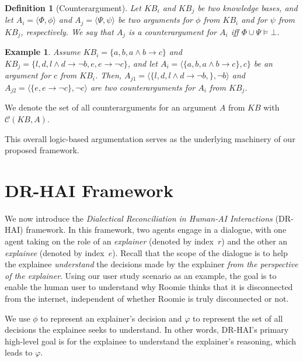 \documentclass{ecai}
\newtheorem{definition}{{\bf Definition}}
\newtheorem{example}{\bf Example}
\begin{document}
\begin{definition}[Counterargument]
   Let $KB_i$ and $KB_j$ be two knowledge bases, and let $A_i = \langle \Phi, \phi \rangle$ and $A_j = \langle \Psi, \psi \rangle$ be two arguments for $\phi$ from $KB_i$ and for $\psi$ from $KB_j$, respectively. We say that $A_j$ is a \emph{counterargument} for $A_i$ iff $\Phi \cup \Psi \models \bot$.
\end{definition}




\begin{example}
\label{ex2}
Assume $KB_i = \{a, b, a \land b \!\rightarrow\!  c \}$ and $KB_j = \{l, d, l \land d \!\rightarrow\! \neg b, e, e \!\rightarrow\! \neg c \}$, and let $A_i = \langle \{a, b, a\land b \!\rightarrow\! c\}, c \}$ be an argument for $c$ from $KB_i$. Then, $A_{j1} = \langle \{l, d, l \land d \!\rightarrow\! \neg b,\},  \neg b \rangle$ and $A_{j2} = \langle \{e, e \!\rightarrow\! \neg c \}, \neg c \rangle$ are two \emph{counterarguments} for $A_i$ from $KB_j$.
\end{example}

\noindent We denote the set of all counterarguments for an argument $A$ from $KB$ with $\mathcal{C}(KB, A)$.



This overall logic-based argumentation serves as the underlying machinery of our proposed framework.


\section{DR-HAI Framework}
\label{drai-frame}




We now introduce the \emph{Dialectical Reconciliation in Human-AI Interactions} (DR-HAI) framework. In this framework, two agents engage in a dialogue, with one agent taking on the role of an \emph{explainer} (denoted by index~$r$) and the other an \emph{explainee} (denoted by index~$e$). Recall that the scope of the dialogue is to help the explainee \emph{understand} the decisions made by the explainer \emph{from the perspective of the explainer}. Using our user study scenario as an example, the goal is to enable the human user to understand why Roomie thinks that it is disconnected from the internet, independent of whether Roomie is truly disconnected or not. 

We use $\phi$ to represent an explainer's decision and $\varphi$ to represent the set of all decisions the explainee seeks to understand. In other words, DR-HAI's primary high-level goal is for the explainee to understand the explainer's reasoning, which leads to $\varphi$.
\end{document}
